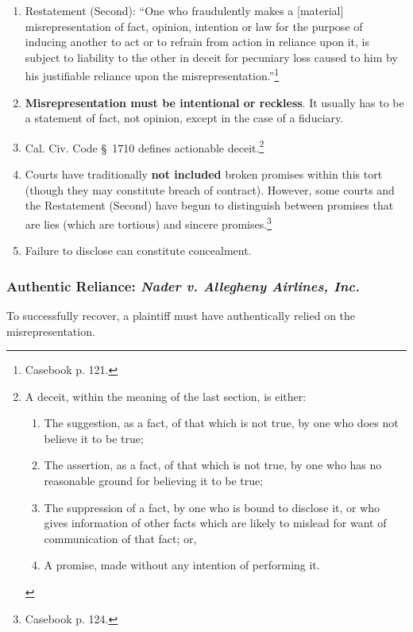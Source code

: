 \begin{enumerate}
    \item Restatement (Second): ``One who fraudulently makes a [material] 
    misrepresentation of fact, opinion, intention or law for the purpose of 
    inducing another to act or to refrain from action in reliance upon it, is 
    subject to liability to the other in deceit for pecuniary loss caused to 
    him by his justifiable reliance upon the 
    misrepresentation.''\footnote{Casebook p. 121.}
    \item \textbf{Misrepresentation must be intentional or reckless}. It 
    usually has to be a statement of fact, not opinion, except in the case of 
    a fiduciary.  \item Cal. Civ. Code \S\ 1710 defines actionable 
    deceit.\footnote{A deceit, within the meaning of the last section, is 
    either:
    \begin{enumerate}
        \item The suggestion, as a fact, of that which is not true, by one who 
        does not believe it to be true;
        \item The assertion, as a fact, of that which is not true, by one who 
        has no reasonable ground for believing it to be true;
        \item The suppression of a fact, by one who is bound to disclose it, 
        or who gives information of other facts which are likely to mislead 
        for want of communication of that fact; or,
        \item A promise, made without any intention of performing it.
    \end{enumerate}}
    \item Courts have traditionally \textbf{not included} broken promises 
    within this tort (though they may constitute breach of contract). However, 
    some courts and the Restatement (Second) have begun to distinguish between 
    promises that are lies (which are tortious) and sincere 
    promises.\footnote{Casebook p. 124.}
    \item Failure to disclose can constitute concealment.
\end{enumerate}

\subsubsection{Authentic Reliance: \emph{Nader v. Allegheny Airlines, Inc.}}

To successfully recover, a plaintiff must have authentically relied on the 
misrepresentation.


